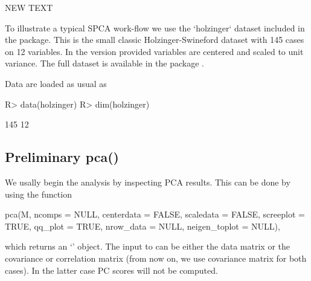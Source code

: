 \documentclass[article]{jss}
\newcommand{\class}[1]{`\code{#1}'}
\begin{document}
NEW TEXT






To illustrate a typical SPCA work-flow we use the `holzinger` dataset included in the package. This is the small classic Holzinger-Swineford dataset with 145 cases on 12 variables. In the version provided variables are centered and scaled to unit variance. The full dataset is available in the  package  \citep{psychTools}. 


Data are loaded as usual as
\begin{Schunk}
\begin{Sinput}
R> data(holzinger)
R> dim(holzinger)
\end{Sinput}
\begin{Soutput}
[1] 145  12
\end{Soutput}
\end{Schunk}
\subsection{Preliminary pca()}
We usally begin the analysis by inspecting PCA results. This can be done by using the function

\begin{Code}
pca(M, ncomps = NULL, centerdata = FALSE, scaledata = FALSE, 
    screeplot = TRUE, qq_plot = TRUE, nrow_data = NULL, neigen_toplot = NULL), 
\end{Code}    
which returns an \class{spca} object.
The input to  can be either the data matrix or the covariance or correlation matrix (from now on, we use covariance matrix for both cases). In the latter case PC scores will not be computed.
\end{document}
